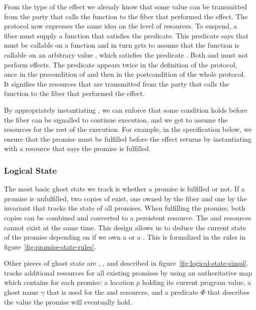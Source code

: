 From the type of the \esuspend{} effect we already know that some value can be transmitted from the party that calls the  function to the fiber that performed the effect.
The \esuspend{} protocol now expresses the same idea on the level of resources.
To suspend, a fiber must supply a function  that satisfies the \gsIsReg{} predicate.
This predicate says that  must be callable on a  function and in turn gets to assume that the  function is callable on an arbitrary value , which satisfies the predicate .
Both  and  must not perform effects.
The predicate  appears twice in the definition of the protocol, once in the precondition of  and then in the postcondition of the whole protocol.
It signifies the resources that are transmitted from the party that calls the  function to the fiber that performed the effect.

By appropriately instantiating , we can enforce that some condition holds before the fiber can be signalled to continue execution, and we get to assume the resources  for the rest of the execution.
For example, in the  specification below, we ensure that the promise must be fulfilled before the effect returns by instantiating  with a resource that says the promise is fulfilled.

\subsubsection{Logical State}
\label{sec:sched-spec-state}

The most basic ghost state we track is whether a promise is fulfilled or not.
If a promise  is unfulfilled, two copies of \gspwait{} exist, one owned by the fiber and one by the invariant that tracks the state of all promises.
When fulfilling the promise, both copies can be combined and converted to a persistent \gspdone{} resource.
The \gspwait{} and \gspdone{} resources cannot exist at the same time.
This design allows us to deduce the current state of the promise depending on if we own a \gspwait{} or a \gspdone{}.
This is formalized in the rules in figure~\ref{fig:promise-state-rules}.

Other pieces of ghost state are \gsPInvIn{}, \gsIsPr{}, and \gsReady{} described in figure~\ref{fig:logical-state-simpl}.
\gsPInvIn{} tracks additional resources for all existing promises by using an authoritative map which contains for each promise:
a location \(p\) holding its current program value, a ghost name \(\gamma\) that is used for the \gspwait{} and \gspdone{} resources, and a predicate \(Φ\) that describes the value the promise will eventually hold.

